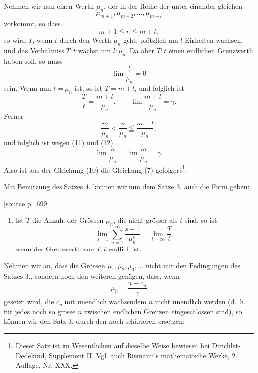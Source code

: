 \documentclass[11pt]{article}
\newcommand{\srcpage}[1]{\par\medskip\noindent\textsf{[source p.~#1]}\par\smallskip}
\begin{document}
Nehmen wir nun einen Werth $\mu_n$, der in der Reihe der unter einander gleichen
\[
\mu_{m+1},\mu_{m+2},\ldots,\mu_{m+l}
\]
vorkommt, so dass
\[
m+1\leqq n\leqq m+l,
\]
so wird $T$, wenn $t$ durch den Werth $\mu_n$ geht, plötzlich um $l$ Einheiten wachsen, und das Verhältniss $T:t$ wächst um $l:\mu_n$. Da aber $T:t$ einen endlichen Grenzwerth haben soll, so muss
\begin{equation}
\lim\frac{l}{\mu_n}=0
\tag{11}
\end{equation}
sein. Wenn nun $t=\mu_n$ ist, so ist $T=m+l$, und folglich ist
\begin{equation}
\frac{T}{t}=\frac{m+l}{\mu_n},\qquad
\lim\frac{m+l}{\mu_n}=\gamma.
\tag{12}
\end{equation}
Ferner
\[
\frac{m}{\mu_n}<\frac{n}{\mu_n}\leqq\frac{m+l}{\mu_n},
\]
und folglich ist wegen (11) und (12)
\[
\lim\frac{n}{\mu_n}=\lim\frac{m}{\mu_n}=\gamma.
\]
Also ist aus der Gleichung (10) die Gleichung (7) gefolgert\footnote{Dieser Satz ist im Wesentlichen auf dieselbe Weise bewiesen bei Dirichlet-Dedekind, Supplement II. Vgl. auch Riemann's mathematische Werke, 2. Auflage, Nr. XXX.}.

Mit Benutzung des Satzes 4. können wir nun dem Satze 3. auch die Form geben:

\srcpage{699}
\begin{enumerate}[label=\textbf{\arabic*.},leftmargin=2.2em,start=5]
\item Ist $T$ die Anzahl der Grössen $\mu_n$, die nicht grösser als $t$ sind, so ist
\begin{equation}
\lim_{s=1}\sum_{n=1}^{\infty}\frac{s-1}{\mu_n^s}=\lim_{t=\infty}\frac{T}{t},
\tag{13}
\end{equation}
wenn der Grenzwerth von $T:t$ endlich ist.
\end{enumerate}

Nehmen wir an, dass die Grössen $\mu_1,\mu_2,\mu_3,\ldots$ nicht nur den Bedingungen des Satzes 3., sondern noch den weiteren genügen, dass, wenn
\begin{equation}
\mu_n=\frac{n+c_n}{\gamma}
\tag{14}
\end{equation}
gesetzt wird, die $c_n$ mit unendlich wachsendem $n$ nicht unendlich werden (d.\ h. für jedes noch so grosse $n$ zwischen endlichen Grenzen eingeschlossen sind), so können wir den Satz 3. durch den noch schärferen ersetzen:
\end{document}
